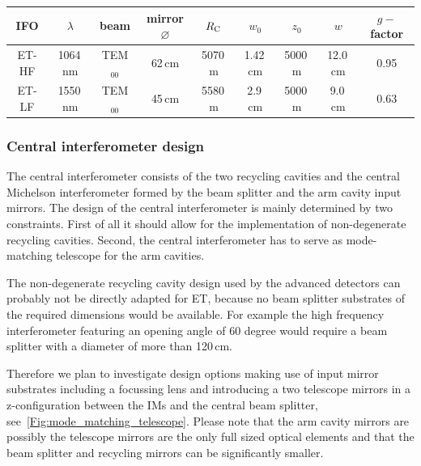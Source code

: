 \begin{center}
\begin{tabular}{|c|c|c|c|c|c|c|c|c|}
  \hline
IFO & $\lambda$& beam & mirror $\varnothing$ & $R_{\rm C}$ & $w_0$ &$z_0$ & $w$ & $g-$factor \\
\hline
ET-HF & 1064\,nm & TEM$_{00}$ & 62\,cm & 5070\,m & 1.42\,cm & 5000\,m & 12.0\,cm & 0.95\\
\hline
ET-LF & 1550\,nm & TEM$_{00}$ & 45\,cm &5580\,m & 2.9\,cm & 5000\,m & 9.0\,cm & 0.63\\
\hline
\end{tabular}
\end{center}


\FloatBarrier
\subsubsection{Central interferometer design}
\label{sec:opt_layout_CITF}

The central interferometer consists of the two recycling cavities and the
central Michelson interferometer formed by the beam splitter and the arm cavity
input mirrors. The design of the central interferometer is mainly determined by
two constraints. First of all it should allow for the implementation of
non-degenerate recycling cavities. Second, the central interferometer has to
serve as mode-matching telescope for the arm cavities.

The non-degenerate recycling cavity design used by the advanced detectors 
can probably not be directly
adapted for ET, because no beam splitter substrates of the required dimensions
would be available. For example the high frequency interferometer featuring an
opening angle of 60 degree would require a beam splitter with a diameter of
more than 120\,cm.

Therefore we plan to investigate design options making use of input mirror
substrates including a focussing lens and introducing a two telescope 
mirrors in a z-configuration between the IMs and the central beam
splitter, see~\ref{Fig:mode_matching_telescope}.
Please note that the arm cavity mirrors are  possibly the telescope mirrors are
the only full sized optical elements and that the beam splitter and recycling
mirrors  can be significantly smaller.

